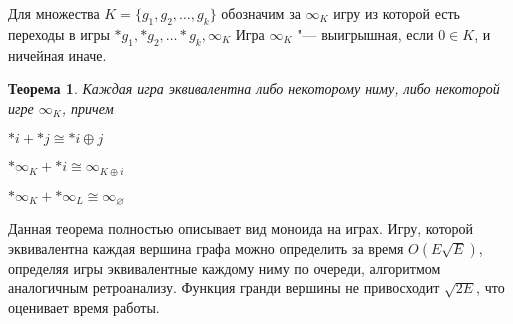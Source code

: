 \documentclass[12pt,a4paper]{article}
\theoremstyle{plain}
\newtheorem{thm}{Теорема}
\newcommand{\nim}[1]{*#1}
\begin{document}
Для множества $K = \{g_1, g_2, \dots, g_k\} $ обозначим за $\infty_K$ игру из которой есть переходы
в игры $\nim{g_1}, \nim{g_2}, \dots \nim{g_k}, \infty_K$
Игра $\infty_K$ "--- выигрышная, если $0 \in K$, и ничейная иначе.

\begin{thm}
Каждая игра эквивалентна либо некоторому ниму, либо некоторой игре $\infty_K$, причем
\item $\nim{i} + \nim{j} \cong \nim{i \oplus j}$
\item $\nim{\infty_K} + \nim{i} \cong \infty_{K \oplus i}$
\item $\nim{\infty_K} + \nim{\infty_L} \cong \infty_\varnothing$
\end{thm}

Данная теорема полностью описывает вид моноида на играх. Игру, которой эквивалентна каждая вершина графа можно определить за время $O(E\sqrt{E})$,
определяя игры эквивалентные каждому ниму по очереди, алгоритмом аналогичным ретроанализу. Функция гранди вершины не привосходит $\sqrt{2E}$, что оценивает время работы.
\end{document}
